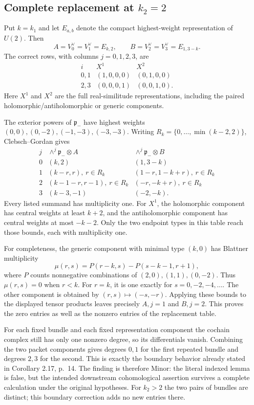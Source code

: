 \documentclass[10pt]{article}
\begin{document}
\subsection*{Complete replacement at \(k_2=2\)}
Put \(k=k_1\) and let \(E_{a,b}\) denote the compact highest-weight representation of \(U(2)\). Then \[A=V_0^\vee=V_1^\vee=E_{k,2},\qquad
 B=V_2^\vee=V_3^\vee=E_{1,3-k}.\] The correct rows, with columns \(j=0,1,2,3\), are \[\begin{array}{c|cc}
 i&X^1&X^2\\ \hline
 0,1&(1,0,0,0)&(0,1,0,0)\\
 2,3&(0,0,0,1)&(0,0,1,0).
\end{array}\] Here \(X^1\) and \(X^2\) are the full real-similitude representations, including the paired holomorphic/antiholomorphic or generic components.\par
The exterior powers of \(\mathfrak p_-\) have highest weights \((0,0),(0,-2),(-1,-3),(-3,-3)\). Writing \(R_k=\{0,\ldots,\min(k-2,2)\}\), Clebsch–Gordan gives \[\begin{array}{c|cc}
j&\wedge^j\mathfrak p_-\otimes A&
  \wedge^j\mathfrak p_-\otimes B\\ \hline
0&(k,2)&(1,3-k)\\
1&(k-r,r),\ r\in R_k&(1-r,1-k+r),\ r\in R_k\\
2&(k-1-r,r-1),\ r\in R_k&(-r,-k+r),\ r\in R_k\\
3&(k-3,-1)&(-2,-k).
\end{array}\] Every listed summand has multiplicity one. For \(X^1\), the holomorphic component has central weights at least \(k+2\), and the antiholomorphic component has central weights at most \(-k-2\). Only the two endpoint types in this table reach those bounds, each with multiplicity one.\par
For completeness, the generic component with minimal type \((k,0)\) has Blattner multiplicity \[\mu(r,s)=P(r-k,s)-P(s-k-1,r+1),\] where \(P\) counts nonnegative combinations of \((2,0),(1,1),(0,-2)\). Thus \(\mu(r,s)=0\) when \(r<k\). For \(r=k\), it is one exactly for \(s=0,-2,-4,\ldots\). The other component is obtained by \((r,s)\mapsto(-s,-r)\). Applying these bounds to the displayed tensor products leaves precisely \(A,j=1\) and \(B,j=2\). This proves the zero entries as well as the nonzero entries of the replacement table.\par
For each fixed bundle and each fixed representation component the cochain complex still has only one nonzero degree, so its differentials vanish. Combining the two packet components gives degrees \(0,1\) for the first repeated bundle and degrees \(2,3\) for the second. This is exactly the boundary behavior already stated in Corollary 2.17, p. 14. The finding is therefore Minor: the literal indexed lemma is false, but the intended downstream cohomological assertion survives a complete calculation under the original hypotheses. For \(k_2>2\) the two pairs of bundles are distinct; this boundary correction adds no new entries there.\par
\end{document}
